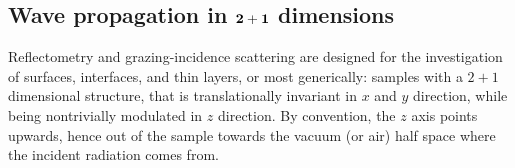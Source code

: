 \subsection{Wave propagation in $\mathbf{2+1}$ dimensions}

Reflectometry and grazing-incidence scattering
are designed for the investigation of surfaces, interfaces, and thin layers,
or most generically:
samples with a $2+1$ dimensional structure,
that is translationally invariant in $x$ and $y$ direction,
while being nontrivially modulated in $z$ direction.
By convention,
the $z$ axis points upwards, hence out of the sample towards the
vacuum (or air) half space where the incident radiation comes from.

